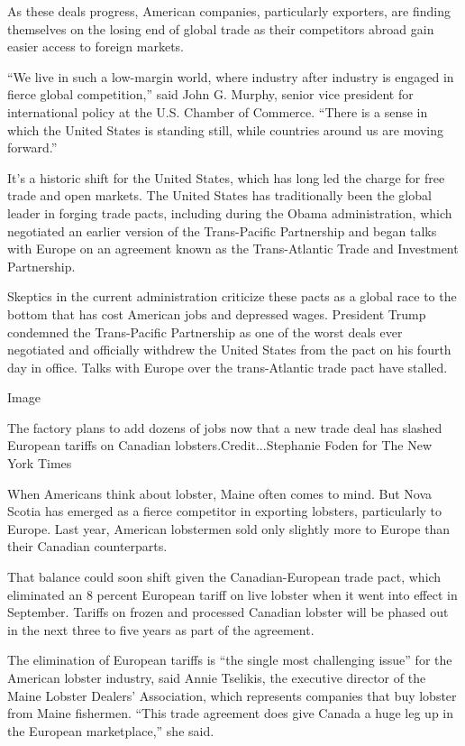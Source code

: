 As these deals progress, American companies, particularly exporters, are
finding themselves on the losing end of global trade as their
competitors abroad gain easier access to foreign markets.

``We live in such a low-margin world, where industry after industry is
engaged in fierce global competition,'' said John G. Murphy, senior vice
president for international policy at the U.S. Chamber of Commerce.
``There is a sense in which the United States is standing still, while
countries around us are moving forward.''

It's a historic shift for the United States, which has long led the
charge for free trade and open markets. The United States has
traditionally been the global leader in forging trade pacts, including
during the Obama administration, which negotiated an earlier version of
the Trans-Pacific Partnership and began talks with Europe on an
agreement known as the Trans-Atlantic Trade and Investment Partnership.

Skeptics in the current administration criticize these pacts as a global
race to the bottom that has cost American jobs and depressed wages.
President Trump condemned the Trans-Pacific Partnership as one of the
worst deals ever negotiated and officially withdrew the United States
from the pact on his fourth day in office. Talks with Europe over the
trans-Atlantic trade pact have stalled.

Image

The factory plans to add dozens of jobs now that a new trade deal has
slashed European tariffs on Canadian lobsters.Credit...Stephanie Foden
for The New York Times

When Americans think about lobster, Maine often comes to mind. But Nova
Scotia has emerged as a fierce competitor in exporting lobsters,
particularly to Europe. Last year, American lobstermen sold only
slightly more to Europe than their Canadian counterparts.

That balance could soon shift given the Canadian-European trade pact,
which eliminated an 8 percent European tariff on live lobster when it
went into effect in September. Tariffs on frozen and processed Canadian
lobster will be phased out in the next three to five years as part of
the agreement.

The elimination of European tariffs is ``the single most challenging
issue'' for the American lobster industry, said Annie Tselikis, the
executive director of the Maine Lobster Dealers' Association, which
represents companies that buy lobster from Maine fishermen. ``This trade
agreement does give Canada a huge leg up in the European marketplace,''
she said.

